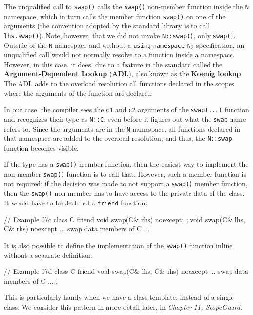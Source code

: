 The unqualified call to \texttt{swap()} calls the \texttt{swap()} non-member function inside the \texttt{N} namespace, which in turn calls the member function \texttt{swap()} on one of the arguments (the convention adopted by the standard library is to call \texttt{lhs.swap()}). Note, however, that we did not invoke \texttt{N::swap()}, only \texttt{swap()}. Outside of the \texttt{N} namespace and without a \texttt{using} \texttt{namespace} \texttt{N;} specification, an unqualified call would not normally resolve to a function inside a namespace. However, in this case, it does, due to a feature in the standard called the \textbf{Argument-Dependent Lookup} (\textbf{ADL}), also known as the \textbf{Koenig lookup}. The ADL adds to the overload resolution all functions declared in the scopes where the arguments of the function are declared.

In our case, the compiler sees the \texttt{c1} and \texttt{c2} arguments of the \texttt{swap(...)} function and recognizes their type as \texttt{N::C}, even before it figures out what the \texttt{swap} name refers to. Since the arguments are in the \texttt{N} namespace, all functions declared in that namespace are added to the overload resolution, and thus, the \texttt{N::swap} function becomes visible.

If the type has a \texttt{swap()} member function, then the easiest way to implement the non-member \texttt{swap()} function is to call that. However, such a member function is not required; if the decision was made to not support a \texttt{swap()} member function, then the \texttt{swap()} non-member has to have access to the private data of the class. It would have to be declared a \texttt{friend} function:

\begin{code}
// Example 07c
class C {
  friend void swap(C& rhs) noexcept;
};
void swap(C& lhs, C& rhs) noexcept {
  ... swap data members of C ...
}
\end{code}

It is also possible to define the implementation of the \texttt{swap()} function inline, without a separate definition:

\begin{code}
// Example 07d
class C {
  friend void swap(C& lhs, C& rhs) noexcept {
    ... swap data members of C ...
  }
};
\end{code}

This is particularly handy when we have a class template, instead of a single class. We consider this pattern in more detail later, in \emph{Chapter} \emph{11, ScopeGuard}.

